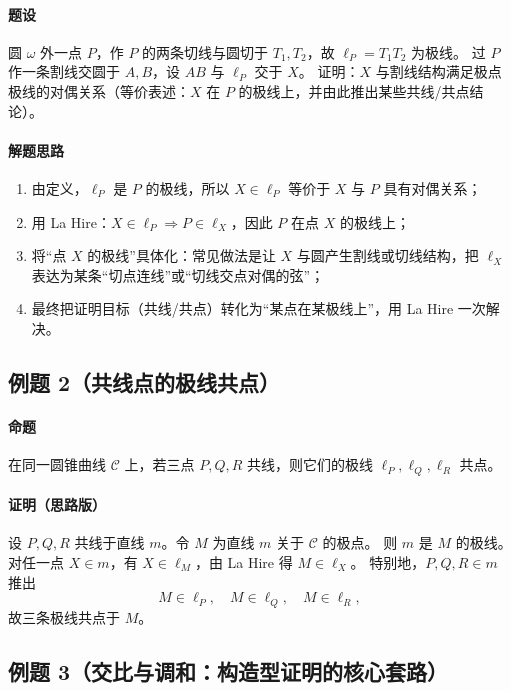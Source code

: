 \documentclass[UTF8]{ctexart}
\begin{document}
	\paragraph{题设}
	圆 $\omega$ 外一点 $P$，作 $P$ 的两条切线与圆切于 $T_1,T_2$，故 $\ell_P=T_1T_2$ 为极线。
	过 $P$ 作一条割线交圆于 $A,B$，设 $AB$ 与 $\ell_P$ 交于 $X$。
	证明：$X$ 与割线结构满足极点极线的对偶关系（等价表述：$X$ 在 $P$ 的极线上，并由此推出某些共线/共点结论）。
	
	\paragraph{解题思路}
	\begin{enumerate}
		\item 由定义，$\ell_P$ 是 $P$ 的极线，所以 $X\in \ell_P$ 等价于 $X$ 与 $P$ 具有对偶关系；
		\item 用 La Hire：$X\in \ell_P \Rightarrow P\in \ell_X$，因此 $P$ 在点 $X$ 的极线上；
		\item 将“点 $X$ 的极线”具体化：常见做法是让 $X$ 与圆产生割线或切线结构，把 $\ell_X$ 表达为某条“切点连线”或“切线交点对偶的弦”；
		\item 最终把证明目标（共线/共点）转化为“某点在某极线上”，用 La Hire 一次解决。
	\end{enumerate}
	
	\subsection{例题 2（共线点的极线共点）}
	\paragraph{命题}
	在同一圆锥曲线 $\mathcal{C}$ 上，若三点 $P,Q,R$ 共线，则它们的极线 $\ell_P,\ell_Q,\ell_R$ 共点。
	
	\paragraph{证明（思路版）}
	设 $P,Q,R$ 共线于直线 $m$。令 $M$ 为直线 $m$ 关于 $\mathcal{C}$ 的极点。
	则 $m$ 是 $M$ 的极线。对任一点 $X\in m$，有 $X\in \ell_M$，由 La Hire 得 $M\in \ell_X$。
	特别地，$P,Q,R\in m$ 推出
	\[
	M\in \ell_P,\quad M\in \ell_Q,\quad M\in \ell_R,
	\]
	故三条极线共点于 $M$。
	
	\subsection{例题 3（交比与调和：构造型证明的核心套路）}
\end{document}
